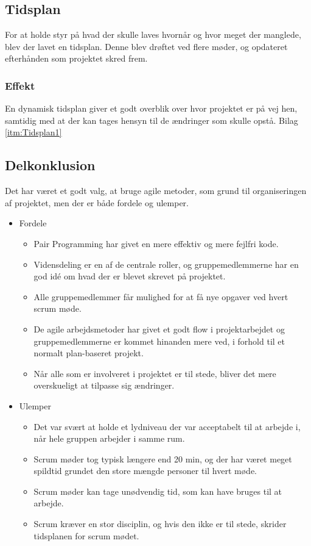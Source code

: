 
\subsection{Tidsplan}
For at holde styr på hvad der skulle laves hvornår og hvor meget der manglede, blev der lavet en tidsplan. Denne blev drøftet ved flere møder, og opdateret efterhånden som projektet skred frem.

\subsubsection{Effekt}
En dynamisk tidsplan giver et godt overblik over hvor projektet er på vej hen, samtidig med at der kan tages hensyn til de ændringer som skulle opstå.  Bilag \ref{itm:Tidsplan1}

\subsection{Delkonklusion}
Det har været et godt valg, at bruge agile metoder, som grund til organiseringen af projektet, men der er både fordele og ulemper.\\

\begin{itemize}
	\item Fordele
\begin{itemize}
	\item Pair Programming har givet en mere effektiv og mere fejlfri kode.
	\item Vidensdeling er en af de centrale roller, og gruppemedlemmerne har en god idé om hvad der er blevet skrevet på 					  projektet.
	\item Alle gruppemedlemmer får mulighed for at få nye opgaver ved hvert scrum møde.
	\item De agile arbejdsmetoder har givet et godt flow i projektarbejdet og gruppemedlemmerne er kommet 					  hinanden mere ved, i forhold til et normalt plan-baseret projekt.
	\item Når alle som er involveret i projektet er til stede, bliver det mere overskueligt at tilpasse sig ændringer.
\end{itemize}

	\item Ulemper
\begin{itemize}
	\item Det var svært at holde et lydniveau der var acceptabelt til at arbejde i, når hele gruppen arbejder i samme rum.
	\item Scrum møder tog typisk længere end 20 min, og der har været meget spildtid grundet den store mængde personer til hvert møde.
	\item Scrum møder kan tage unødvendig tid, som kan have bruges til at arbejde.
	\item Scrum kræver en stor disciplin, og hvis den ikke er til stede, skrider tidsplanen for scrum mødet.
\end{itemize}
\end{itemize}

